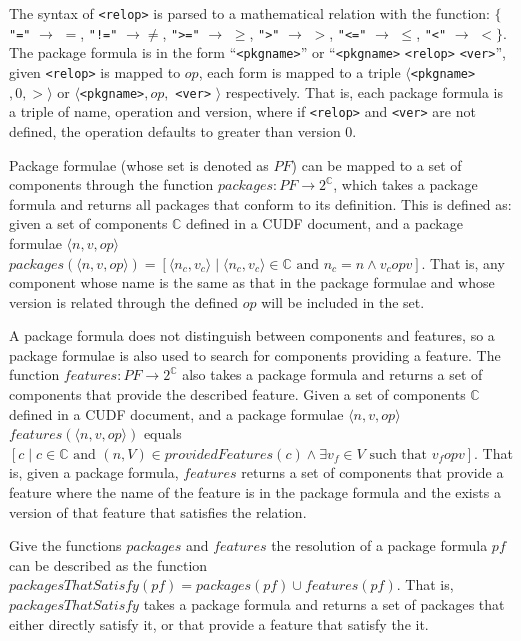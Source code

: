 The syntax of \verb+<relop>+ is parsed to a mathematical relation with the function:  
$\{$ \verb+"="+ $\rightarrow$ $=$, \verb+"!="+ $\rightarrow \not =$, \verb+">="+ $\rightarrow$ $\geq$, \verb+">"+ $\rightarrow$ $>$, \verb+"<="+ $\rightarrow$ $\leq$, \verb+"<"+ $\rightarrow$ $<$$\}$.
The package formula is in the form ``\verb+<pkgname>+'' or  ``\verb+<pkgname>+ \verb+<relop>+ \verb+<ver>+'',
given \verb+<relop>+ is mapped to $op$, each form is mapped to a triple $\langle $\verb+<pkgname>+$,0,>\rangle$ or $\langle$\verb+<pkgname>+$,op,$ \verb+<ver>+ $\rangle$ respectively.
That is, each package formula is a triple of name, operation and version, 
where if \verb+<relop>+ and \verb+<ver>+ are not defined, the operation defaults to greater than version 0.

Package formulae (whose set is denoted as $PF$) can be mapped to a set of components through the function $packages: PF \rightarrow 2^{\mathbb{C}}$,
which takes a package formula and returns all packages that conform to its definition.
This is defined as:
given a set of components $\mathbb{C}$ defined in a CUDF document, and a package formulae $\langle n,v,op\rangle$
$packages(\langle n,v,op\rangle) = [\langle n_c,v_c \rangle \mid \langle n_c,v_c \rangle \in \mathbb{C} \mbox{ and } n_c = n \wedge v_c op v]$.
That is, any component whose name is the same as that in the package formulae and whose version is related through the defined $op$ will be included in the set.

A package formula does not distinguish between components and features, so a package formulae is also used to search for components providing a feature.
The function $features: PF \rightarrow 2^{\mathbb{C}}$ also takes a package formula and returns a set of components that provide the described feature.
Given a set of components $\mathbb{C}$ defined in a CUDF document, and a package formulae $\langle n,v,op\rangle$
$features(\langle n,v,op\rangle)$ equals 
$[c \mid c\in \mathbb{C} \mbox{ and } (n,V) \in providedFeatures(c) \wedge \exists v_f \in V \mbox { such that } v_f op v ]$.
That is, given a package formula, 
$features$ returns a set of components that provide a feature where the name of the feature is in the package formula and the exists a version of that feature that satisfies the relation. 

Give the functions $packages$ and $features$ the resolution of a package formula $pf$ can be described as the function $packagesThatSatisfy(pf) = packages(pf) \cup features(pf)$.
That is, $packagesThatSatisfy$ takes a package formula and returns a set of packages that either directly satisfy it, or that provide a feature that satisfy the it.


